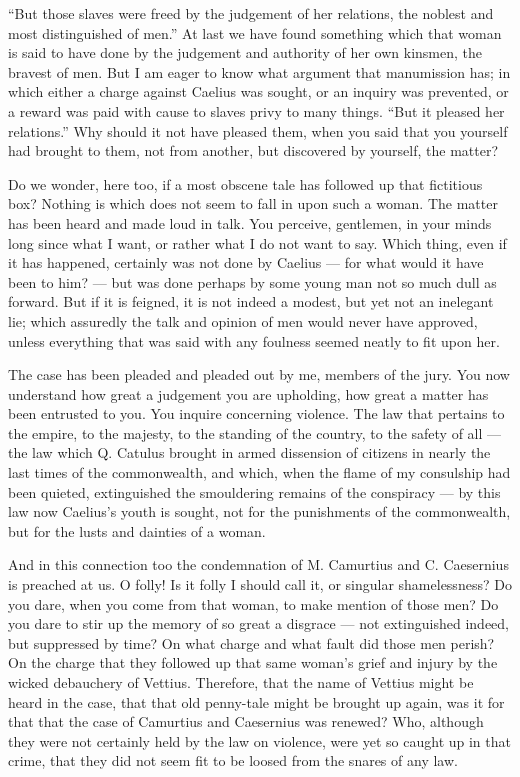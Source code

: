  ``But those slaves were freed by the judgement of her relations, the noblest and most distinguished of men.'' At last we have found something which that woman is said to have done by the judgement and authority of her own kinsmen, the bravest of men. But I am eager to know what argument that manumission has; in which either a charge against Caelius was sought, or an inquiry was prevented, or a reward was paid with cause to slaves privy to many things. ``But it pleased her relations.'' Why should it not have pleased them, when you said that you yourself had brought to them, not from another, but discovered by yourself, the matter?

 Do we wonder, here too, if a most obscene tale has followed up that fictitious box? Nothing is which does not seem to fall in upon such a woman. The matter has been heard and made loud in talk. You perceive, gentlemen, in your minds long since what I want, or rather what I do not want to say. Which thing, even if it has happened, certainly was not done by Caelius --- for what would it have been to him? --- but was done perhaps by some young man not so much dull as forward. But if it is feigned, it is not indeed a modest, but yet not an inelegant lie; which assuredly the talk and opinion of men would never have approved, unless everything that was said with any foulness seemed neatly to fit upon her.

 The case has been pleaded and pleaded out by me, members of the jury. You now understand how great a judgement you are upholding, how great a matter has been entrusted to you. You inquire concerning violence. The law that pertains to the empire, to the majesty, to the standing of the country, to the safety of all --- the law which Q. Catulus brought in armed dissension of citizens in nearly the last times of the commonwealth, and which, when the flame of my consulship had been quieted, extinguished the smouldering remains of the conspiracy --- by this law now Caelius's youth is sought, not for the punishments of the commonwealth, but for the lusts and dainties of a woman.

 And in this connection too the condemnation of M. Camurtius and C. Caesernius is preached at us. O folly! Is it folly I should call it, or singular shamelessness? Do you dare, when you come from that woman, to make mention of those men? Do you dare to stir up the memory of so great a disgrace --- not extinguished indeed, but suppressed by time? On what charge and what fault did those men perish? On the charge that they followed up that same woman's grief and injury by the wicked debauchery of Vettius. Therefore, that the name of Vettius might be heard in the case, that that old penny-tale might be brought up again, was it for that that the case of Camurtius and Caesernius was renewed? Who, although they were not certainly held by the law on violence, were yet so caught up in that crime, that they did not seem fit to be loosed from the snares of any law.

